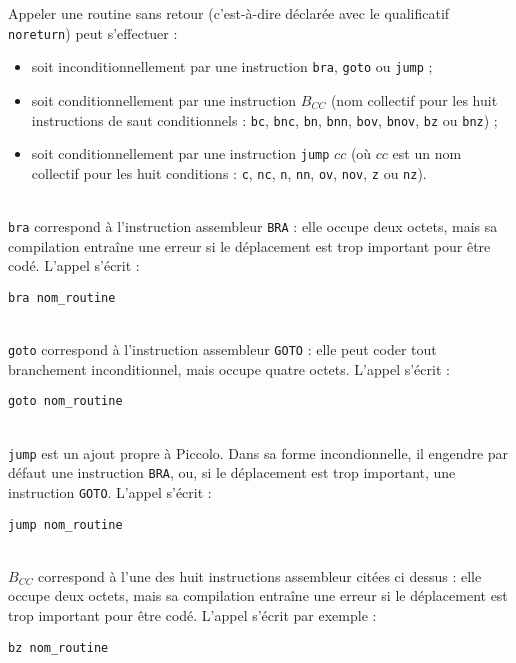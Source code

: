 
Appeler une routine sans retour (c'est-à-dire déclarée avec le qualificatif \texttt{noreturn}) peut s'effectuer :
\begin{itemize}
  \item soit inconditionnellement par une instruction  \texttt{bra}, \texttt{goto} ou \texttt{jump} ;
  \item soit conditionnellement par une instruction $B_{CC}$ (nom collectif pour les huit instructions de saut conditionnels : \texttt{bc}, \texttt{bnc}, \texttt{bn}, \texttt{bnn}, \texttt{bov}, \texttt{bnov}, \texttt{bz} ou \texttt{bnz}) ;
  \item soit conditionnellement par une instruction \texttt{jump} $cc$ (où $cc$ est un nom collectif pour les huit conditions : \texttt{c}, \texttt{nc}, \texttt{n}, \texttt{nn}, \texttt{ov}, \texttt{nov}, \texttt{z} ou \texttt{nz}).
\end{itemize}



~\\
\texttt{bra} correspond à l’instruction assembleur \texttt{BRA} : elle occupe deux octets, mais sa compilation entraîne une erreur si le déplacement est trop important pour être codé. L'appel s'écrit :
\begin{lstlisting}[language=piccolo]
bra nom_routine
\end{lstlisting}



~\\
\texttt{goto} correspond à l’instruction assembleur \texttt{GOTO} : elle peut coder tout branchement inconditionnel, mais occupe quatre octets. L'appel s'écrit :
\begin{lstlisting}[language=piccolo]
goto nom_routine
\end{lstlisting}


~\\
\texttt{jump} est un ajout propre à Piccolo. Dans sa forme incondionnelle, il engendre par défaut une instruction \texttt{BRA}, ou, si le déplacement est trop important, une instruction \texttt{GOTO}. L'appel s'écrit :
\begin{lstlisting}[language=piccolo]
jump nom_routine
\end{lstlisting}

~\\
$B_{CC}$ correspond à l’une des huit instructions assembleur citées ci dessus : elle occupe deux octets, mais sa compilation entraîne une erreur si le déplacement est trop important pour être codé. L'appel s'écrit par exemple :
\begin{lstlisting}[language=piccolo]
bz nom_routine
\end{lstlisting}


